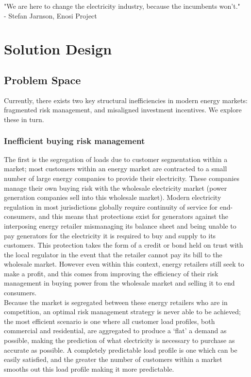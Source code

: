 \documentclass{article}
\theoremstyle{definition}
\theoremstyle{plain} %
\begin{document}
\noindent "We are here to change the electricity industry, because the incumbents won’t."\\
- Stefan Jarnson, Enosi Project




\pagebreak
\section{Solution Design}

\subsection{Problem Space}

Currently, there exists two key structural inefficiencies in modern energy markets: fragmented risk management, and misaligned investment incentives. We explore these in turn.

\subsubsection{Inefficient buying risk management}

The first is the segregation of loads due to customer segmentation within a market; most customers within an energy market are contracted to a small number of large energy companies to provide their electricity. These companies manage their own buying risk with the wholesale electricity market (power generation companies sell into this wholesale market). Modern electricity regulation in most jurisdictions globally require continuity of service for end-consumers, and this means that protections exist for generators against the interposing energy retailer mismanaging its balance sheet and being unable to pay generators for the electricity it is required to buy and supply to its customers. This protection takes the form of a credit or bond held on trust with the local regulator in the event that the retailer cannot pay its bill to the wholesale market. However even within this context, energy retailers still seek to make a profit, and this comes from improving the efficiency of their risk management in buying power from the wholesale market and selling it to end consumers. \\

\noindent Because the market is segregated between these energy retailers who are in competition, an optimal risk management strategy is never able to be achieved; the most efficient scenario is one where all customer load profiles, both commercial and residential, are aggregated to produce a ‘flat’ a demand as possible, making the prediction of what electricity is necessary to purchase as accurate as possible. A completely predictable load profile is one which can be easily satisfied, and the greater the number of customers within a market smooths out this load profile making it more predictable.
\end{document}
